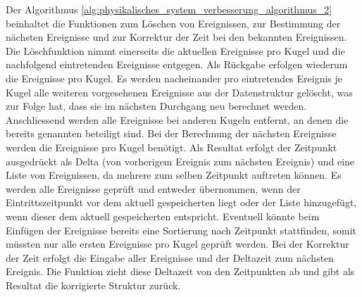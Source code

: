 \newpage
Der Algorithmus \ref{alg:physikalisches_system_verbesserung_algorithmus_2} beinhaltet die Funktionen zum Löschen von
Ereignissen, zur Bestimmung der nächsten Ereignisse und zur Korrektur der Zeit bei den bekannten Ereignissen.
Die Löschfunktion nimmt einerseits die aktuellen Ereignisse pro Kugel und die nachfolgend eintretenden Ereignisse
entgegen. Als Rückgabe erfolgen wiederum die Ereignisse pro Kugel.
Es werden nacheinander pro eintretendes Ereignis je Kugel alle weiteren vorgesehenen Ereignisse aus der Datenstruktur gelöscht,
was zur Folge hat, dass sie im nächsten Durchgang neu berechnet werden.
Anschliessend werden alle Ereignisse bei anderen Kugeln entfernt, an denen die bereits genannten beteiligt sind.
Bei der Berechnung der nächsten Ereignisse werden die Ereignisse pro Kugel benötigt.
Als Resultat erfolgt der Zeitpunkt ausgedrückt als Delta (von vorherigem Ereignis zum nächsten Ereignis)
und eine Liste von Ereignissen, da mehrere zum selben Zeitpunkt auftreten können.
Es werden alle Ereignisse geprüft und entweder übernommen, wenn der Eintrittszeitpunkt vor dem
aktuell gespeicherten liegt oder der Liste hinzugefügt, wenn dieser dem aktuell gespeicherten entspricht.
Eventuell könnte beim Einfügen der Ereignisse bereits eine Sortierung nach Zeitpunkt stattfinden, somit müssten nur
alle ersten Ereignisse pro Kugel geprüft werden. Bei der Korrektur der Zeit erfolgt die Eingabe
aller Ereignisse und der Deltazeit zum nächsten Ereignis. Die Funktion zieht diese Deltazeit von den
Zeitpunkten ab und gibt als Resultat die korrigierte Struktur zurück.

